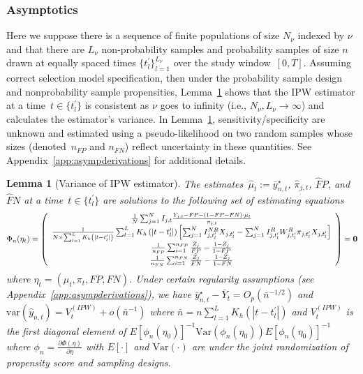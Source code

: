 \documentclass[11pt]{amsart}
\numberwithin{equation}{section}
\theoremstyle{plain}
\newtheorem{lemma}[theorem]{Lemma}
\begin{document}
 \subsubsection{Asymptotics}
 \label{section:asymptotics}

 Here we suppose there is a sequence of finite populations of size $N_{\nu}$ indexed by $\nu$ and that there are $L_\nu$ non-probability samples and probability samples of size $n$ drawn at equally spaced times $\{ t^\prime_l \}_{l=1}^{L_{\nu}}$ over the study window~$[0,T]$. Assuming correct selection model specification, then under the probability sample design and nonprobability sample propensities, Lemma~\ref{lemma:ipw} shows that the IPW estimator at a time~$t \in \{ t^\prime_l \}$ is consistent as $\nu$ goes to infinity (i.e., $N_{\nu}, L_{\nu} \to \infty$) and calculates the estimator's variance.  In Lemma~\ref{lemma:ipw}, sensitivity/specificity are unknown and estimated using a pseudo-likelihood on two random samples whose sizes (denoted~$n_{FP}$ and $n_{FN}$) reflect uncertainty in these quantities.  See Appendix~\ref{app:asympderivations} for additional details.

 \begin{lemma}[Variance of IPW estimator] \normalfont
 \label{lemma:ipw}
The estimates~$\hat \mu_t := \bar y_{n,t}^\star$, $\hat \pi_{j,t}$, $\hat FP$, and $\hat FN$ at a time~$t \in \{t_l^\prime\}$ are solutions to the following set of estimating equations
 $$
 \Phi_n (\eta_t) =
 \left (
 \begin{array}{c}
 \frac{1}{N} \sum_{j=1}^N I_{j,t} \frac{Y_{j,t} - FP - (1-FP-FN) \cdot \mu_t}{\pi_{j,t}} \\
 \frac{1}{N \times \sum_{l = 1}^L K_h \left(|t - t_l^\prime| \right)} \sum_{l = 1}^L K_h \left(|t - t_l^\prime| \right) \left[ \sum_{j=1}^N I^{NR}_{j,t_l^\prime} X_{j,t_l^\prime} - \sum_{j = 1}^N I^{R}_{j,t_l^\prime} W^{R}_{j,t_l^\prime}  \pi_{j,t_l^\prime} X_{j,t_l^\prime}  \right] \\
 \frac{1}{n_{FP}} \sum_{i=1}^{n_{FP}} \frac{Z_j}{FP} - \frac{1-Z_j}{1-FP} \\
 \frac{1}{n_{FN}} \sum_{i=1}^{n_{FN}} \frac{\tilde Z_j}{FN} - \frac{1-\tilde Z_j}{1-FN} \\
 \end{array}
 \right ) = {\bf 0}
 $$
 where $\eta_t = (\mu_t, \pi_t, FP, FN)$. Under certain regularity assumptions (see Appendix~\ref{app:asympderivations}), we have $\bar y_{n,t}^\star - \bar Y_{t} = O_p (\bar n^{-1/2})$  and $\text{var} (\hat y_{n,t}) = V_{t}^{(IPW)} + o (\bar n^{-1})$ where $\bar n = n \sum_{l=1}^L K_{h} (|t - t_l^\prime|)$ and $V_t^{(IPW)}$ is the first diagonal element of $E [\phi_n(\eta_0)]^{-1} \text{Var}(\phi_n(\eta_0))E [\phi_n(\eta_0)]^{-1}$ where $\phi_n = \frac{\partial \Phi (\eta)}{\partial \eta}$ with $E[\cdot]$ and $\text{Var} (\cdot)$ are under the joint randomization of propensity score and sampling designs.
 \end{lemma}
\end{document}
